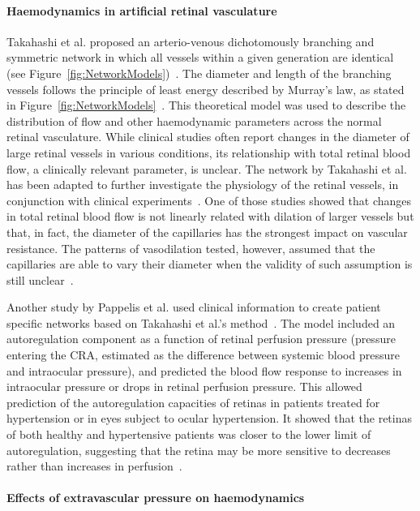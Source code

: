 \documentclass{article}
\begin{document}
\paragraph*{Haemodynamics in artificial retinal vasculature}

Takahashi et al. proposed an arterio-venous dichotomously branching and symmetric network in which all vessels within a given generation are identical (see Figure~\ref{fig:NetworkModels})~\cite{Takahashi_2009}.
The diameter and length of the branching vessels follows the principle of least energy described by Murray's law, as stated in Figure~\ref{fig:NetworkModels}~\cite{Murray_1926}.
This theoretical model was used to describe the distribution of flow and other haemodynamic parameters across the normal retinal vasculature.
While clinical studies often report changes in the diameter of large retinal vessels in various conditions, its relationship with total retinal blood flow, a clinically relevant parameter, is unclear.
The network by Takahashi et al. has been adapted to further investigate the physiology of the retinal vessels, in conjunction with clinical experiments~\cite{Aschinger_2017,Pappelis_2020}.
One of those studies showed that changes in total retinal blood flow is not linearly related with dilation of larger vessels but that, in fact, the diameter of the capillaries has the strongest impact on vascular resistance.
The patterns of vasodilation tested, however, assumed that the capillaries are able to vary their diameter when the validity of such assumption is still unclear~\cite{Kur_2012}.

Another study by Pappelis et al. used clinical information to create patient specific networks based on Takahashi et al.'s method~\cite{Pappelis_2020}.
The model included an autoregulation component as a function of retinal perfusion pressure (pressure entering the CRA, estimated as the difference between systemic blood pressure and intraocular pressure), and predicted the blood flow response to increases in intraocular pressure or drops in retinal perfusion pressure.
This allowed prediction of the autoregulation capacities of retinas in patients treated for hypertension or in eyes subject to ocular hypertension.
It showed that the retinas of both healthy and hypertensive patients was closer to the lower limit of autoregulation, suggesting that the retina may be more sensitive to decreases rather than increases in perfusion~\cite{Pappelis_2020}.


\paragraph*{Effects of extravascular pressure on haemodynamics} %
\end{document}
